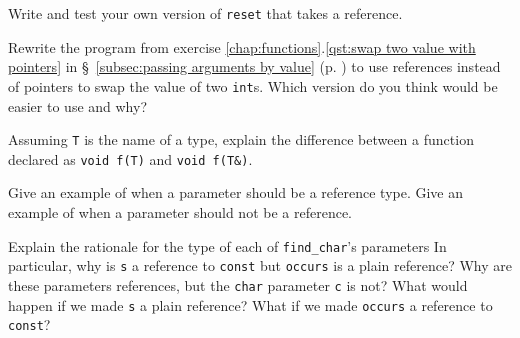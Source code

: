 %
%
\begin{question}
Write and test your own version of \verb|reset| that takes a reference.
\end{question}

\begin{question}
Rewrite the program from exercise \ref{chap:functions}.\ref{qst:swap two value with pointers} in \S~\ref{subsec:passing arguments by value} (p. \pageref{subsec:passing arguments by value})
to use references instead of pointers to swap the value of two \verb|int|s. Which
version do you think would be easier to use and why?
\end{question}

\begin{question}
Assuming \verb|T| is the name of a type, explain the difference
between a function declared as \verb|void f(T)| and \verb|void f(T&)|.
\end{question}

\begin{question}
Give an example of when a parameter should be a reference
type. Give an example of when a parameter should not be a reference.
\end{question}

\begin{question}
Explain the rationale for the type of each of \verb|find_char|’s
parameters In particular, why is \verb|s| a reference to \verb|const| but \verb|occurs| is a
plain reference? Why are these parameters references, but the \verb|char|
parameter \verb|c| is not? What would happen if we made \verb|s| a plain reference?
What if we made \verb|occurs| a reference to \verb|const|?
\end{question}
